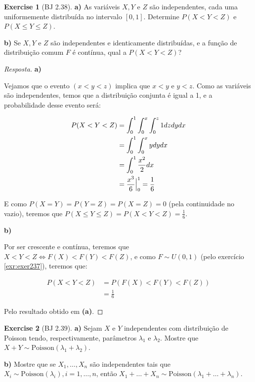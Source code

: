 \documentclass[
]{article}
\theoremstyle{definition}
\theoremstyle{definition}
\theoremstyle{definition}
\newtheorem{exercise}{Exercise}[section]
\theoremstyle{definition}
\theoremstyle{remark}
\begin{document}
\begin{exercise}[BJ 2.38]
\textbf{a)} As variáveis \(X, Y\) e \(Z\) são independentes, cada uma uniformemente distribuída no intervalo \([0,1]\). Determine \(P(X < Y < Z)\) e \(P(X \le Y \le Z)\).

\textbf{b)} Se \(X,Y\) e \(Z\) são independentes e identicamente distribuídas, e a função de distribuição comum \(F\) é contínua, qual a \(P(X < Y < Z)\)?
\end{exercise}

\begin{proof}[Resposta]
\textbf{a)}

Vejamos que o evento \((x < y < z)\) implica que \(x < y\) e \(y < z\). Como as variáveis são independentes, temos que a distribuição conjunta é igual a 1, e a probabilidade desse evento será:

\begin{align*}
P(X < Y < Z) &= \int_{0}^{1}\int_{0}^{x}\int_{0}^{z}1dzdydx \\
&= \int_{0}^{1}\int_{0}^{x}ydydx \\
&= \int_{0}^{1}\frac{x^{2}}{2}dx \\
&= \frac{x^{3}}{6}\Big{|}_{0}^{1} = \frac{1}{6}
\end{align*}

E como \(P(X = Y) = P(Y = Z) = P(X = Z) = 0\) (pela continuidade no vazio), teremos que \(P(X \le Y \le Z) = P(X < Y < Z) = \frac{1}{6}\).

\textbf{b)}

Por ser crescente e contínua, teremos que \(X < Y < Z \Leftrightarrow F(X) < F(Y) < F(Z)\), e como \(F \sim U(0,1)\) (pelo exercício \ref{exr:exer237}), teremos que:

\begin{align*}
P(X < Y < Z) &= P(F(X) < F(Y) < F(Z)) \\
&= \frac{1}{6}
\end{align*}

Pelo resultado obtido em \textbf{(a)}.
\end{proof}

\begin{exercise}[BJ 2.39]
\protect\hypertarget{exr:exer239}{}\label{exr:exer239}\textbf{a)} Sejam \(X\) e \(Y\) independentes com distribuição de Poisson tendo, respectivamente, parâmetros \(\lambda_{1}\) e \(\lambda_{2}\). Mostre que \(X + Y \sim \mathrm{Poisson}(\lambda_{1} + \lambda_{2})\).

\textbf{b)} Mostre que se \(X_{1},\ldots,X_{n}\) são independentes tais que \(X_{i} \sim \mathrm{Poisson}(\lambda_{i}),i=1,\ldots,n\), então \(X_{1} + \ldots + X_{n} \sim \mathrm{Poisson}(\lambda_{1} + \ldots + \lambda_{n})\).
\end{exercise}
\end{document}
